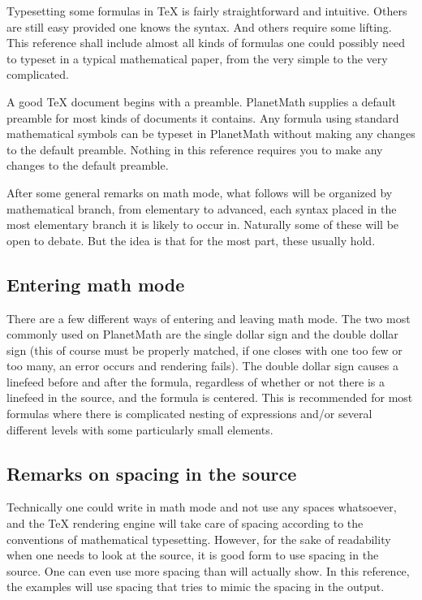 Typesetting some formulas in \TeX{} is fairly straightforward and intuitive. Others are still easy provided one knows the syntax. And others require some lifting. This reference shall include almost all kinds of formulas one could possibly need to typeset in a typical mathematical paper, from the very simple to the very complicated.

A good \TeX{} document begins with a preamble. PlanetMath supplies a default preamble for most kinds of documents it contains. Any formula using standard mathematical symbols can be typeset in PlanetMath without making any changes to the default preamble. Nothing in this reference requires you to make any changes to the default preamble. %

After some general remarks on math mode, what follows will be organized by mathematical branch, from elementary to advanced, each syntax placed in the most elementary branch it is likely to occur in. Naturally some of these will be open to debate. But the idea is that for the most part, these usually hold.

\subsection*{Entering math mode}

There are a few different ways of entering and leaving math mode. The two most commonly used on PlanetMath are the single dollar sign and the double dollar sign (this of course must be properly matched, if one closes with one too few or too many, an error occurs and rendering fails). The double dollar sign causes a linefeed before and after the formula, regardless of whether or not there is a linefeed in the source, and the formula is centered. This is recommended for most formulas where there is complicated nesting of expressions and/or several different levels with some particularly small elements.

\subsection{Remarks on spacing in the source}

Technically one could write in math mode and not use any spaces whatsoever, and the \TeX{} rendering engine will take care of spacing according to the conventions of mathematical typesetting. However, for the sake of readability when one needs to look at the source, it is good form to use spacing in the source. One can even use more spacing than will actually show. In this reference, the examples will use spacing that tries to mimic the spacing in the output.

